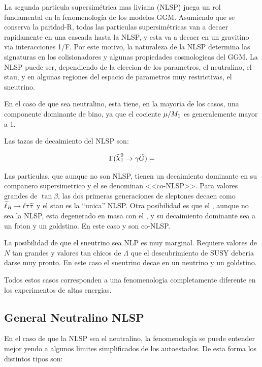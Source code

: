 La segunda particula supersimétrica mas liviana (NLSP) juega un rol
fundamental en la fenomenología de los modelos GGM. Asumiendo que se
conserva la paridad-R, todas las particulas supersimétricas van a decaer
rapidamente en una cascada hasta la NLSP, y esta va a decaer en un gravitino
via interacciones 1/F. Por este motivo, la naturaleza de la NLSP
determina las signaturas en los colisionadores y algunas propiedades
cosmologicas del GGM. La NLSP puede ser, dependiendo de la eleccion 
de los parametros, el neutralino, el stau, y en algunas regiones del
espacio de parametros muy restrictivas, el sneutrino.

En el caso de que sea neutralino, esta tiene, en la mayoria de los
casos, una componente dominante de bino, ya que el cociente $\mu/M_{1}$
es generalemente mayor a 1. %

Las tazas de decaimiento del {\ninoone} NLSP son:

\begin{align}
  \Gamma (\ninoone \to \gamma \gravino) =
\end{align}

Las particulas, que aunque no son NLSP, tienen un decaimiento dominante en
su companero supersimetrico y el {\gravino} se denominan <<co-NLSP>>.
Para valores grandes de $\tan \beta$, las dos primeras generaciones de
sleptones decaen como $\widetilde{\ell}_R \rightarrow \ell \tau \widetilde{\tau}$ y el stau
es la ``unica'' NLSP. Otra posibilidad es que el {\ninoone}, aunque no sea
la NLSP, esta degenerado en masa con el {\stau}, y su decaimiento dominante
sea a un foton y un goldstino. En este caso {\stau} y {\ninoone} son co-NLSP.

La posibilidad de que el sneutrino sea NLP es muy marginal. Requiere valores
de $N$ tan grandes y valores tan chicos de $\Lambda$ que el descubrimiento de
SUSY deberia darse muy pronto. En este caso el sneutrino decae en un neutrino
y un goldstino.

Todos estos casos corresponden a una fenomenologia completamente diferente en
los experimentos de altas energias.

\subsection{General Neutralino NLSP}

En el caso de que la NLSP sea el neutralino, la fenomenolog\'ia se puede entender mejor yendo a
algunos limites simplificados de los autoestados. De esta forma los distintos tipos son:

